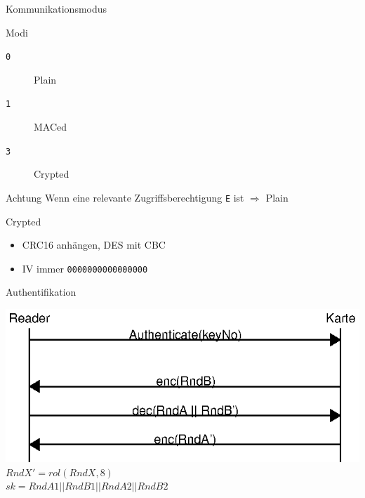 \documentclass{beamer}
\begin{document}
\begin{frame}{Kommunikationsmodus}
  \begin{block}{Modi}
    \begin{description}
    \item[\texttt{0}] Plain
    \item[\texttt{1}] MACed
    \item[\texttt{3}] Crypted
    \end{description}
  \end{block}
\pause
  \begin{alertblock}{Achtung}
    Wenn eine relevante Zugriffsberechtigung \texttt{E} ist
    $\Rightarrow$ Plain
  \end{alertblock}
\pause
\begin{block}{Crypted}
  \begin{itemize}
  \item CRC16 anh\"angen, DES mit CBC
  \item IV immer \texttt{0000000000000000}
  \end{itemize}
\end{block}
\end{frame}

\begin{frame}{Authentifikation}
  \begin{center}
    \includegraphics{auth.eps} \\
    $RndX' = rol(RndX, 8)$\\
    $sk = RndA1 || RndB1 || RndA2 || RndB2$
  \end{center}
\end{frame}
\end{document}
